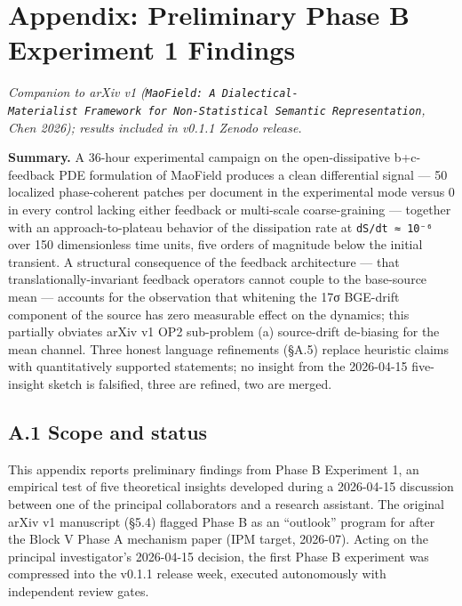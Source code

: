 \documentclass[
]{article}
\author{}
\date{}
\begin{document}
\hypertarget{appendix-preliminary-phase-b-experiment-1-findings}{%
\section{Appendix: Preliminary Phase B Experiment 1
Findings}\label{appendix-preliminary-phase-b-experiment-1-findings}}

\emph{Companion to arXiv v1
(\texttt{MaoField:\ A\ Dialectical-Materialist\ Framework\ for\ Non-Statistical\ Semantic\ Representation},
Chen 2026); results included in v0.1.1 Zenodo release.}

\textbf{Summary.} A 36-hour experimental campaign on the
open-dissipative b+c-feedback PDE formulation of MaoField produces a
clean differential signal --- 50 localized phase-coherent patches per
document in the experimental mode versus 0 in every control lacking
either feedback or multi-scale coarse-graining --- together with an
approach-to-plateau behavior of the dissipation rate at
\texttt{dS/dt\ ≈\ 10⁻⁶} over 150 dimensionless time units, five orders
of magnitude below the initial transient. A structural consequence of
the feedback architecture --- that translationally-invariant feedback
operators cannot couple to the base-source mean --- accounts for the
observation that whitening the 17σ BGE-drift component of the source has
zero measurable effect on the dynamics; this partially obviates arXiv v1
OP2 sub-problem (a) source-drift de-biasing for the mean channel. Three
honest language refinements (§A.5) replace heuristic claims with
quantitatively supported statements; no insight from the 2026-04-15
five-insight sketch is falsified, three are refined, two are merged.

\hypertarget{a.1-scope-and-status}{%
\subsection{A.1 Scope and status}\label{a.1-scope-and-status}}

This appendix reports preliminary findings from Phase B Experiment 1, an
empirical test of five theoretical insights developed during a
2026-04-15 discussion between one of the principal collaborators and a
research assistant. The original arXiv v1 manuscript (§5.4) flagged
Phase B as an ``outlook'' program for after the Block V Phase A
mechanism paper (IPM target, 2026-07). Acting on the principal
investigator's 2026-04-15 decision, the first Phase B experiment was
compressed into the v0.1.1 release week, executed autonomously with
independent review gates.
\end{document}
